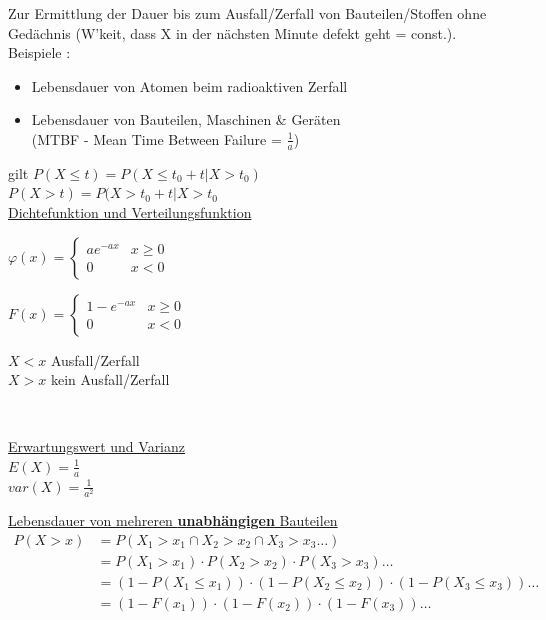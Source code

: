 		Zur Ermittlung der Dauer bis zum Ausfall/Zerfall von Bauteilen/Stoffen ohne Gedächnis
		(W'keit, dass X in der nächsten Minute defekt geht = const.). Beispiele :
		\begin{itemize}
          \item Lebensdauer von Atomen beim radioaktiven Zerfall
          \item Lebensdauer von Bauteilen, Maschinen \& Geräten\\(MTBF -
          Mean Time Between Failure = $\frac{1}{a}$)
    \end{itemize}
    
    gilt $P(X \leq t) = P(X \leq t_0 + t | X > t_0)$\\
    $P(X > t) = P(X > t_0 + t | X > t_0$\\
    
		\underline{Dichtefunktion und Verteilungsfunktion}\\
    \begin{minipage}{5cm}
      $\varphi(x)=\begin{cases}
        a e^{-a x}  & x \geq 0\\
        0						& x < 0
      \end{cases}$
      
      $F(x)=\begin{cases}
        1-e^{-a x}  		& x \geq 0\\
        0	 					& x < 0
      \end{cases}$
    \end{minipage} 
    \begin{minipage}{4.5cm}
      $X < x$ Ausfall/Zerfall\\
      $X > x$ kein Ausfall/Zerfall
    \end{minipage}\\
    
    \begin{minipage}[t]{6cm}
      \underline{Erwartungswert und Varianz}\\
      $E(X)=\frac{1}{a}$\\
      $var(X)=\frac{1}{a^2}$ 
    \end{minipage}
    \begin{minipage}[t]{9cm}
      \underline{Lebensdauer von mehreren \textbf{unabhängigen} Bauteilen}\\
      \begin{align}
        P(X>x) &= P(X_1>x_1 \cap X_2>x_2 \cap X_3>x_3 \ldots) \nonumber \\
        &= P(X_1>x_1) \cdot P(X_2>x_2) \cdot P(X_3>x_3) \ldots \nonumber \\
        &= (1-P(X_1\leq x_1)) \cdot (1-P(X_2\leq x_2)) \cdot (1-P(X_3\leq x_3)) \ldots \nonumber \\
        &= (1-F(x_1)) \cdot (1-F(x_2)) \cdot (1-F(x_3)) \ldots \nonumber
      \end{align}
    \end{minipage}
		
